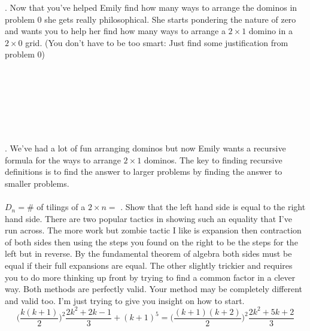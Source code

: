 \documentclass[12pt]{article}
\begin{document}
. Now that you've helped Emily find how many ways to arrange the dominos in problem 0 she gets really philosophical. She starts pondering the nature of zero and wants you to help her find how many ways to arrange a $2 \times 1$ domino in a $2 \times 0$ grid. (You don't have to be too smart: Just find some justification from problem 0)\\\\\\\\\\\\\\\\
. We've had a lot of fun arranging dominos but now Emily wants a recursive formula for the ways to arrange $2 \times 1$ dominos. The key to finding recursive definitions is to find the answer to larger problems by finding the answer to smaller problems.\\\\
$D_n = $\# of tilings of a $2 \times n =$
\newpage
{}. Show that the left hand side is equal to the right hand side. 
There are two popular tactics in showing such an equality that I've run across. 
The more work but zombie tactic I like is expansion then contraction of both sides then using
the steps you found on the right to be the steps for the left but in reverse. By the fundamental theorem of algebra
both sides must be equal if their full expansions are equal. The other slightly
trickier and requires you to do more thinking up front by trying to find a common factor
in a clever way. Both methods are perfectly valid. Your method may be completely different and valid too.
I'm just trying to give you insight on how to start.
$$\bigg(\frac{k(k + 1)}{2}\bigg)^2\frac{2k^2+2k-1}{3} + (k + 1)^5=\big(\frac{(k+1)(k + 2)}{2}\big)^2\frac{2k^2+5k+2}{3} $$
\end{document}
